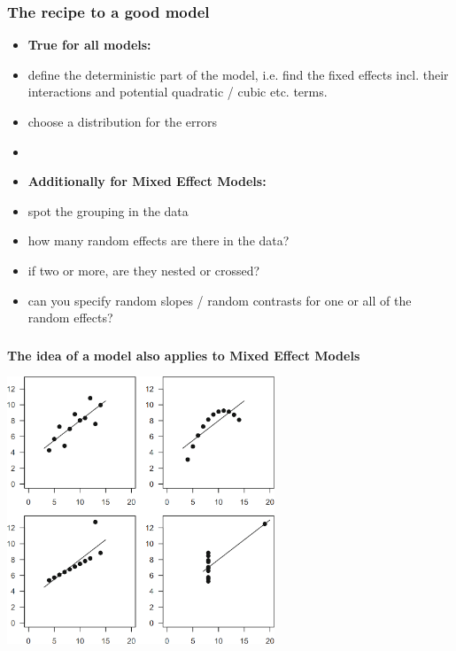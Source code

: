 \documentclass{beamer}
\begin{document}
\begin{frame}
    \frametitle{The recipe to a good model}
    \begin{itemize}
        \item[] \textbf{True for all models:}
        \item define the deterministic part of the model, i.e. find the fixed effects incl. their interactions and potential quadratic / cubic etc. terms.
        \item choose a distribution for the errors
        \item[] 
        \item[] \textbf{Additionally for Mixed Effect Models:}
        \item spot the grouping in the data
        \item how many random effects are there in the data?
        \item if two or more, are they nested or crossed?
        \item can you specify random slopes / random contrasts for one or all of the random effects?
    \end{itemize}
\end{frame}

\begin{frame}[fragile]
    \frametitle{}
    \textbf{The idea of a \color{blue}{sick}} \textbf{model also applies to Mixed Effect Models}
    \vspace{0.2cm}
    \begin{center}
        \includegraphics[width=0.6\textwidth]{lectures/day_7_diagnostics_of_mems/figures/Anscombe.png}
    \end{center}
\end{frame}
\end{document}
